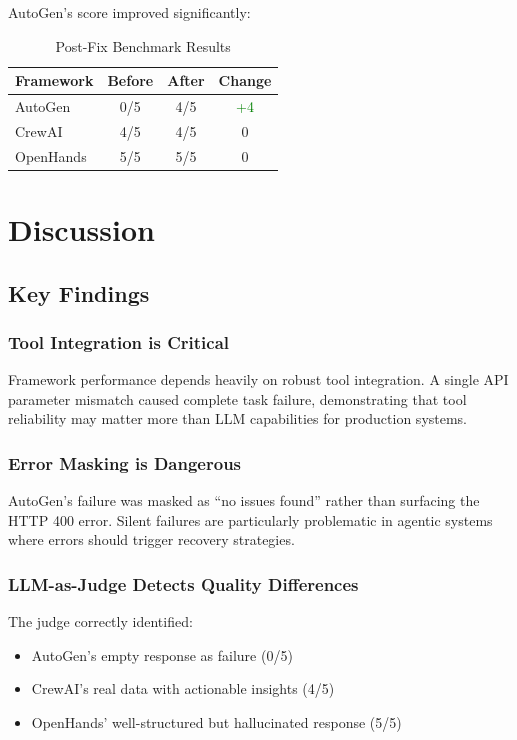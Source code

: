 \documentclass[11pt,a4paper]{article}
\begin{document}
AutoGen's score improved significantly:

\begin{table}[h]
\centering
\caption{Post-Fix Benchmark Results}
\begin{tabular}{lccc}
\toprule
\textbf{Framework} & \textbf{Before} & \textbf{After} & \textbf{Change} \\
\midrule
AutoGen & 0/5 & 4/5 & \textcolor{green}{+4} \\
CrewAI & 4/5 & 4/5 & 0 \\
OpenHands & 5/5 & 5/5 & 0 \\
\bottomrule
\end{tabular}
\label{tab:postfix_results}
\end{table}

\section{Discussion}

\subsection{Key Findings}

\subsubsection{Tool Integration is Critical}

Framework performance depends heavily on robust tool integration. A single API parameter mismatch caused complete task failure, demonstrating that tool reliability may matter more than LLM capabilities for production systems.

\subsubsection{Error Masking is Dangerous}

AutoGen's failure was masked as ``no issues found'' rather than surfacing the HTTP 400 error. Silent failures are particularly problematic in agentic systems where errors should trigger recovery strategies.

\subsubsection{LLM-as-Judge Detects Quality Differences}

The judge correctly identified:
\begin{itemize}
    \item AutoGen's empty response as failure (0/5)
    \item CrewAI's real data with actionable insights (4/5)
    \item OpenHands' well-structured but hallucinated response (5/5)
\end{itemize}
\end{document}
